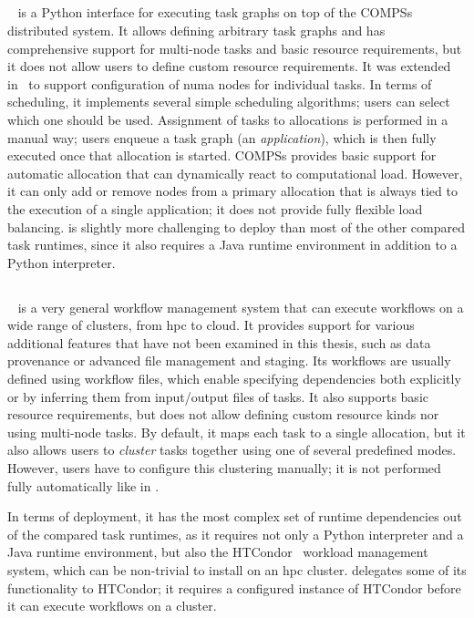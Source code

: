 \begin{spacing}{1}
\subsection*{\pycompss}
\pycompss~\cite{pycompss} is a Python interface for executing task graphs on top of the
COMPSs distributed system. It allows defining arbitrary task graphs and has comprehensive support
for multi-node tasks and basic resource requirements, but it does not allow users to define custom
resource requirements. It was extended in~\cite{pycompss_numa} to support configuration of
\gls{numa} nodes for individual tasks. In terms of scheduling, it implements several
simple scheduling algorithms; users can select which one should be used. Assignment of tasks to allocations is performed in a
manual way; users enqueue a task graph (an \emph{application}), which is then fully executed
once that allocation is started. COMPSs provides basic support for automatic allocation that can
dynamically react to computational load. However, it can only add or remove nodes from a primary
allocation that is always tied to the execution of a single application; it does not provide fully
flexible load balancing. \pycompss{} is slightly more challenging to deploy than most of the other
compared task runtimes, since it also requires a Java runtime environment in addition to a Python
interpreter.

\subsection*{\pegasus}
\pegasus~\cite{pegasus} is a very general workflow management system that can execute
workflows on a wide range of clusters, from \gls{hpc} to cloud. It provides support
for various additional features that have not been examined in this thesis, such as data provenance
or advanced file management and staging. Its workflows are usually defined using workflow files,
which enable specifying dependencies both explicitly or by inferring them from input/output files
of tasks. It also supports basic resource requirements, but does not allow defining custom
resource kinds nor using multi-node tasks. By default, it maps each
task to a single allocation, but it also allows users to \emph{cluster} tasks together using
one of several predefined modes. However, users have to configure this clustering manually; it is
not performed fully automatically like in \hyperqueue{}.

In terms of deployment, it has the most complex set of runtime dependencies out of the compared task
runtimes, as it requires not only a Python interpreter and a Java runtime environment, but also the
HTCondor~\cite{htcondor} workload management system, which can be non-trivial to install on
an \gls{hpc} cluster. \pegasus{} delegates some of its functionality to
HTCondor; it requires a configured instance of HTCondor before it can execute workflows on a
cluster.


\end{spacing}
